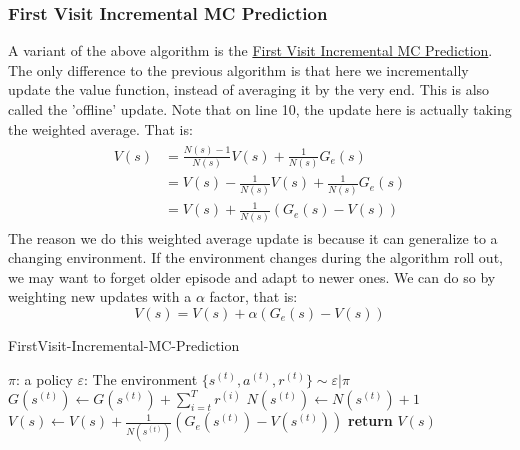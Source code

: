 \documentclass[11pt]{article}
\begin{document}
\subsubsection{First Visit Incremental MC Prediction}
A variant of the above algorithm is the \hyperref[alg:fvimp]{First Visit Incremental MC Prediction}. The only difference to the previous algorithm is that here we incrementally update the value function, instead of averaging it by the very end. This is also called the 'offline' update. Note that on line 10, the update here is actually taking the weighted average. That is:
\begin{align}
\begin{split}
    V(s) &= \frac{N(s) - 1}{N(s)} V(s) + \frac{1}{N(s)} G_e(s) \\
    &= V(s) - \frac{1}{N(s)} V(s) + \frac{1}{N(s)} G_e(s) \\
    &= V(s) + \frac{1}{N(s)} (G_e(s) - V(s))
\end{split}
\end{align}
The reason we do this weighted average update is because it can generalize to a changing environment. If the environment changes during the algorithm roll out, we may want to forget older episode and adapt to newer ones. We can do so by weighting new updates with a \(\alpha\) factor, that is:
\begin{equation}
V(s) = V(s) + \alpha (G_e(s) - V(s))
\end{equation}
\begin{algorithm}
\caption{FirstVisit-Incremental-MC-Prediction}
\label{alg:fvimp}
\begin{algorithmic}[1]
\State $\pi$: a policy
\State $\varepsilon$: The environment
    \State $\{s^{(t)}, a^{(t)}, r^{(t)}\} \sim \varepsilon | \pi$
            \State $G(s^{(t)}) \gets G(s^{(t)}) + \sum_{i=t}^T r^{(i)}$
            \State $N(s^{(t)}) \gets N(s^{(t)}) + 1$
            \State $V(s) \gets V(s) + \frac{1}{N(s^{(t)})} (G_e(s^{(t)}) - V(s^{(t)}))$
        \EndIf
        \EndFor
    \EndFor
    \State \textbf{return} $V(s)$
    \EndProcedure
\end{algorithmic}
\end{algorithm}
\end{document}
